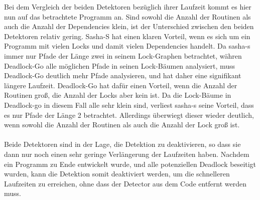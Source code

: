 Bei dem Vergleich der beiden Detektoren bezüglich ihrer 
Laufzeit kommt es hier nun auf das betrachtete Programm an. Sind sowohl die Anzahl 
der Routinen als auch die Anzahl der Dependencies klein, ist der Unterschied
zwischen den beiden Detektoren relativ gering. Sasha-S hat einen klaren 
Vorteil, wenn es sich um ein Programm mit vielen Locks und damit vielen 
Dependencies handelt. Da sasha-s immer nur Pfade der Länge zwei in seinem 
Lock-Graphen betrachtet, 
währen Deadlock-Go alle möglichen Pfade in seinen Lock-Bäumen analysiert, 
muss Deadlock-Go deutlich mehr Pfade analysieren, und hat daher eine signifikant
längere Laufzeit.
Deadlock-Go hat dafür einen Vorteil, wenn die Anzahl der 
Routinen groß, die Anzahl der Locks aber kein ist. Da die Lock-Bäume in Deadlock-go
in diesem Fall alle sehr klein sind, verliest sasha-s seine Vorteil, dass 
es nur Pfade der Länge 2 betrachtet. Allerdings überwiegt dieser wieder 
deutlich, wenn sowohl die Anzahl der Routinen als auch die Anzahl der Lock groß
ist.\\ \\
Beide Detektoren sind in der Lage, die Detektion zu deaktivieren, so dass sie dann nur noch einen
sehr geringe Verlängerung der Laufzeiten haben. Nachdem ein Programm zu Ende entwickelt
wurde, und alle potenziellen Deadlock beseitigt wurden, kann die Detektion somit deaktiviert
werden, um die schnelleren Laufzeiten zu erreichen, ohne dass der Detector aus dem Code entfernt
werden muss.